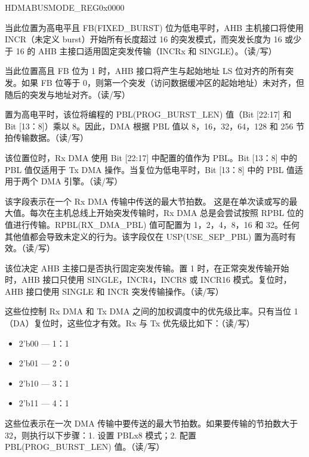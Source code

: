

\begin{register}{H}{DMABUSMODE\_REG}{0x0000}\label{regdesc:DMABUSMODEREG}
%
%
%
%
%
%
%
%
%
%
%
%
%
\regnewline%
\begin{regdesc}\begin{reglist}
\item [DMAMIXEDBURST]当此位置为高电平且 FB(FIXED\_BURST) 位为低电平时，AHB 主机接口将使用 INCR（未定义 burst）开始所有长度超过 16 的突发模式，而突发长度为 16 或少于 16 的 AHB 主接口适用固定突发传输（INCRx 和 SINGLE）。（读/写）
\item [DMAADDRALIBEA]当此位置高且 FB 位为 1 时，AHB 接口将产生与起始地址 LS 位对齐的所有突发。如果 FB 位等于 0，则第一个突发（访问数据缓冲区的起始地址）未对齐，但随后的突发与地址对齐。（读/写）
\item [PBLX8\_MODE] 置为高电平时，该位将编程的 PBL(PROG\_BURST\_LEN) 值（Bit [22:17] 和 Bit [13：8]）乘以 8。因此，DMA 根据 PBL 值以 8，16，32，64，128 和 256 节拍传输数据。（读/写）
\item [USE\_SEP\_PBL]该位置位时，Rx DMA 使用 Bit [22:17] 中配置的值作为 PBL。Bit [13：8] 中的 PBL 值仅适用于 Tx DMA 操作。当复位为低电平时，Bit [13：8] 中的 PBL 值适用于两个 DMA 引擎。（读/写）
\item [RX\_DMA\_PBL] 该字段表示在一个 Rx DMA 传输中传送的最大节拍数。 这是在单次读或写的最大值。每次在主机总线上开始突发传输时，Rx DMA 总是会尝试按照 RPBL 位的值进行传输。RPBL(RX\_DMA\_PBL) 值可配置为 1，2，4，8，16 和 32。任何其他值都会导致未定义的行为。该字段仅在 USP(USE\_SEP\_PBL) 置为高时有效。（读/写）
\item [FIXED\_BURST] 该位决定 AHB 主接口是否执行固定突发传输。置 1 时，在正常突发传输开始时，AHB 接口只使用 SINGLE，INCR4，INCR8 或 INCR16 模式。复位时，AHB 接口使用 SINGLE 和 INCR 突发传输操作。（读/写）
\item [PRI\_RATIO]这些位控制 Rx DMA 和 Tx DMA 之间的加权调度中的优先级比率。只有当位 1（DA）复位时，这些位才有效。Rx 与 Tx 优先级比如下：（读/写）
\begin{itemize}
\item 2'b00 —  1：1
\item 2'b01 —  2：0
\item 2'b10 —  3：1
\item 2'b11 —  4：1
\end{itemize}
\item [PROG\_BURST\_LEN]
这些位表示在一次 DMA 传输中要传送的最大节拍数。如果要传输的节拍数大于 32，则执行以下步骤：1. 设置 PBLx8 模式；2. 配置 PBL(PROG\_BURST\_LEN) 值。（读/写）
\item [寄存器描述下一页继续。]
\end{reglist}\end{regdesc}
\end{register}


